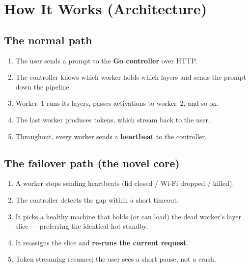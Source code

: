 \section{How It Works (Architecture)}
\label{sec:arch}

\subsection{The normal path}
\begin{enumerate}[leftmargin=1.6em,nosep]
  \item The user sends a prompt to the \textbf{Go controller} over HTTP.
  \item The controller knows which worker holds which layers and sends the
  prompt down the pipeline.
  \item Worker~1 runs its layers, passes activations to worker~2, and so on.
  \item The last worker produces tokens, which stream back to the user.
  \item Throughout, every worker sends a \textbf{heartbeat} to the controller.
\end{enumerate}

\subsection{The failover path (the novel core)}
\begin{enumerate}[leftmargin=1.6em,nosep]
  \item A worker stops sending heartbeats (lid closed / Wi-Fi dropped / killed).
  \item The controller detects the gap within a short timeout.
  \item It picks a healthy machine that holds (or can load) the dead worker's
  layer slice --- preferring the identical hot standby.
  \item It reassigns the slice and \textbf{re-runs the current request}.
  \item Token streaming resumes; the user sees a short pause, not a crash.
\end{enumerate}

